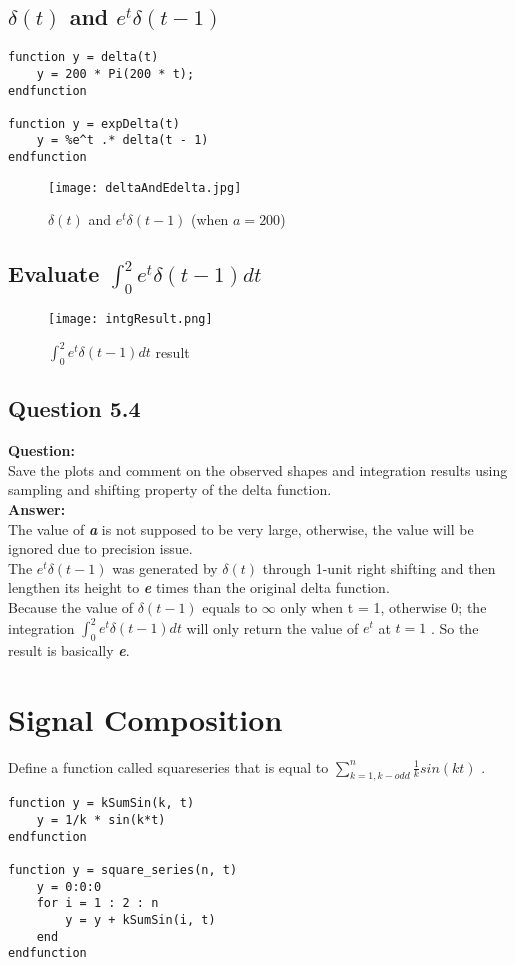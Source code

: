 \documentclass[12pt,fleqn]{article}
\begin{document}
\subsection{$\delta(t)$ and $e^t\delta(t-1)$}
\begin{lstlisting}[frame=single]
function y = delta(t)
    y = 200 * Pi(200 * t);
endfunction

function y = expDelta(t)
    y = %e^t .* delta(t - 1)
endfunction
\end{lstlisting}
\begin{figure}[H]
\centering
\texttt{[image: deltaAndEdelta.jpg]}
\caption{$\delta(t)$ and $e^t\delta(t-1)$ (when $a = 200$)}
\end{figure}

\subsection{Evaluate $\int_0^2 e^t\delta(t-1)dt$}
\begin{figure}[H]
\centering
\texttt{[image: intgResult.png]}
\caption{$\int_0^2 e^t \delta(t-1)dt$ result}
\end{figure}

\subsection{Question 5.4}
\textbf{Question:}\\
Save the plots and comment on the observed shapes and integration results using sampling and shifting property of the delta function.\\
\textbf{Answer:}\\
The value of \emph{\textbf{a}} is not supposed to be very large, otherwise, the value will be ignored due to precision issue.\\
The $e^t\delta(t-1)$ was generated by $\delta(t)$ through 1-unit right shifting and then lengthen its height to \emph{\textbf{e}} times than the original delta function.\\
Because the value of $\delta(t-1)$ equals to $\infty$ only when t = 1, otherwise 0; the integration $\int_0^2 e^t\delta(t-1)dt$ will only return the value of $e^t$ at $t = 1$ . So the result is basically \emph{\textbf{e}}.

\section{Signal Composition}
Define a function called square\underline{}series that is equal to $\sum_{k=1,k-odd}^n\frac{1}{k}sin(kt)$ .
\begin{lstlisting}[frame=single]
function y = kSumSin(k, t)
    y = 1/k * sin(k*t)
endfunction

function y = square_series(n, t)
    y = 0:0:0
    for i = 1 : 2 : n
        y = y + kSumSin(i, t)
    end
endfunction
\end{lstlisting}
\end{document}
